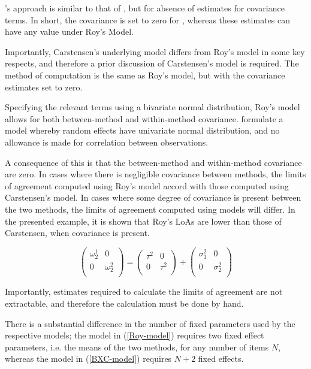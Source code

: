 \documentclass[12pt, a4paper]{report}
\theoremstyle{plain}
\theoremstyle{definition}
\theoremstyle{remark}
\begin{document}
\citet{BXC2008}'s approach is similar to that of \citet{ARoy2009}, but for absence of estimates for covariance terms. In short, the covariance is set to zero for \citet{BXC2008}, whereas these estimates can have any value under Roy's Model. 

Importantly, Carstensen's underlying model differs from Roy's model in some key respects, and therefore a prior discussion of Carstensen's model is required. The method of computation is the same as Roy's model, but with the covariance estimates set to zero.

Specifying the relevant terms using a bivariate normal distribution, Roy's model allows for both between-method and within-method covariance. \citet{BXC2008} formulate a model whereby random effects have univariate normal distribution, and no allowance is made for correlation between observations.


A consequence of this is that the between-method and within-method covariance are zero. In cases where there is negligible covariance between methods, the limits of agreement computed using Roy's model accord with those computed using Carstensen's model. In cases where some degree of covariance is present between the two methods, the limits of agreement computed using models will differ. In the presented example, it is shown that Roy's LoAs are lower than those of Carstensen, when covariance is present. 

\[\left(\begin{array}{cc}
\omega^1_2  & 0 \\
0 & \omega^2_2 \\
\end{array}  \right)
=  \left(
\begin{array}{cc}
\tau^2  & 0 \\
0 & \tau^2 \\
\end{array} \right)+
\left(
\begin{array}{cc}
\sigma^2_1  & 0 \\
0 & \sigma^2_2 \\
\end{array}\right)
\]

Importantly, estimates required to calculate the limits of agreement are not extractable, and therefore the calculation must be done by hand. 



There is a substantial difference in the number of fixed parameters used by the respective models; the model in (\ref{Roy-model}) requires two fixed effect parameters, i.e. the means of the two methods, for any number of items $N$, whereas the model in (\ref{BXC-model}) requires $N+2$ fixed effects.
\end{document}
